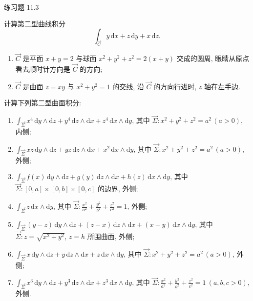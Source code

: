 \begin{exblock}{练习题 11.3}
\item 计算第二型曲线积分
  \[
  \int_{\overrightarrow{C}}y\,\mathrm{d}x+z\,\mathrm{d}y+x\,\mathrm{d}z.
  \]
  \begin{enumerate}[label=(\arabic*),leftmargin=2.6em,itemsep=0.15\baselineskip,topsep=0.2\baselineskip]
  \item $\overrightarrow{C}$ 是平面 $x+y=2$ 与球面 $x^{2}+y^{2}+z^{2}=2(x+y)$ 交成的圆周, 眼睛从原点看去顺时针方向是 $\overrightarrow{C}$ 的方向;
  \item $\overrightarrow{C}$ 是曲面 $z=xy$ 与 $x^{2}+y^{2}=1$ 的交线, 沿 $\overrightarrow{C}$ 的方向行进时, $z$ 轴在左手边.
  \end{enumerate}
\item 计算下列第二型曲面积分:
  \begin{enumerate}[label=(\arabic*),leftmargin=2.6em,itemsep=0.15\baselineskip,topsep=0.2\baselineskip]
  \item $\displaystyle\int_{\overrightarrow{\Sigma}}x^{4}\,\mathrm{d}y\wedge\mathrm{d}z+y^{4}\,\mathrm{d}z\wedge\mathrm{d}x+z^{4}\,\mathrm{d}x\wedge\mathrm{d}y$, 其中 $\overrightarrow{\Sigma}:x^{2}+y^{2}+z^{2}=a^{2}\,(a>0)$, 内侧;
  \item $\displaystyle\int_{\overrightarrow{\Sigma}}xz\,\mathrm{d}y\wedge\mathrm{d}z+yz\,\mathrm{d}z\wedge\mathrm{d}x+x^{2}\,\mathrm{d}x\wedge\mathrm{d}y$, 其中 $\overrightarrow{\Sigma}:x^{2}+y^{2}+z^{2}=a^{2}\,(a>0)$, 外侧;
  \item $\displaystyle\int_{\overrightarrow{\Sigma}}f(x)\,\mathrm{d}y\wedge\mathrm{d}z+g(y)\,\mathrm{d}z\wedge\mathrm{d}x+h(z)\,\mathrm{d}x\wedge\mathrm{d}y$, 其中 $\overrightarrow{\Sigma}:[0,a]\times[0,b]\times[0,c]$ 的边界, 外侧;
  \item $\displaystyle\int_{\overrightarrow{\Sigma}}z\,\mathrm{d}x\wedge\mathrm{d}y$, 其中 $\overrightarrow{\Sigma}:\frac{x^{2}}{a^{2}}+\frac{y^{2}}{b^{2}}+\frac{z^{2}}{c^{2}}=1$, 外侧;
  \item $\displaystyle\int_{\overrightarrow{\Sigma}}(y-z)\,\mathrm{d}y\wedge\mathrm{d}z+(z-x)\,\mathrm{d}z\wedge\mathrm{d}x+(x-y)\,\mathrm{d}x\wedge\mathrm{d}y$, 其中 $\overrightarrow{\Sigma}:z=\sqrt{x^{2}+y^{2}}$, $z=h$ 所围曲面, 外侧;
  \item $\displaystyle\int_{\overrightarrow{\Sigma}}x\,\mathrm{d}y\wedge\mathrm{d}z+y\,\mathrm{d}z\wedge\mathrm{d}x+z\,\mathrm{d}x\wedge\mathrm{d}y$, 其中 $\overrightarrow{\Sigma}:x^{2}+y^{2}+z^{2}=a^{2}\,(a>0)$, 外侧;
  \item $\displaystyle\int_{\overrightarrow{\Sigma}}x^{3}\,\mathrm{d}y\wedge\mathrm{d}z+y^{3}\,\mathrm{d}z\wedge\mathrm{d}x+z^{3}\,\mathrm{d}x\wedge\mathrm{d}y$, 其中 $\overrightarrow{\Sigma}:\frac{x^{2}}{a^{2}}+\frac{y^{2}}{b^{2}}+\frac{z^{2}}{c^{2}}=1\ (a,b,c>0)$, 外侧.
  \end{enumerate}
\end{exblock}

